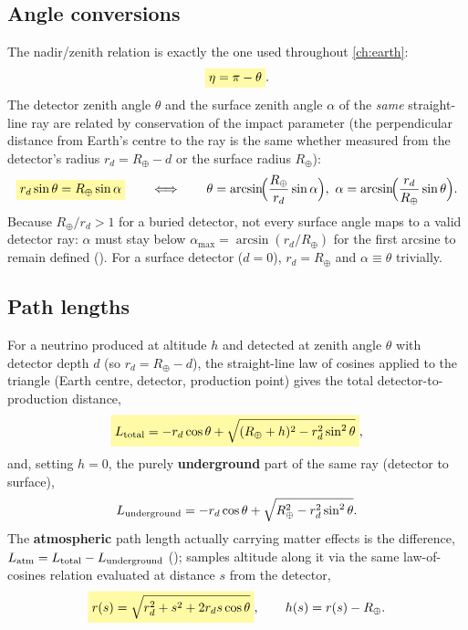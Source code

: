 \begin{theorybox}
\subsection*{Angle conversions}
The nadir/zenith relation is exactly the one used throughout
\cref{ch:earth}:
\begin{equation}
  \keyresult{\eta = \pi - \theta}.
\end{equation}
The detector zenith angle $\theta$ and the surface zenith angle $\alpha$ of
the \emph{same} straight-line ray are related by conservation of the
impact parameter (the perpendicular distance from Earth's centre to the
ray is the same whether measured from the detector's radius $r_d=R_\oplus-d$
or the surface radius $R_\oplus$):
\begin{equation}
  \keyresult{r_d\sin\theta = R_\oplus\sin\alpha}
  \qquad\Longleftrightarrow\qquad
  \theta=\arcsin\!\Bigl(\frac{R_\oplus}{r_d}\sin\alpha\Bigr),\
  \alpha=\arcsin\!\Bigl(\frac{r_d}{R_\oplus}\sin\theta\Bigr).
\end{equation}
Because $R_\oplus/r_d>1$ for a buried detector, not every surface angle
maps to a valid detector ray: $\alpha$ must stay below
$\alpha_{\max}=\arcsin(r_d/R_\oplus)$ for the first arcsine to remain
defined (\pyfunc{alpha\_max\_for\_detector\_depth}). For a surface detector
($d=0$), $r_d=R_\oplus$ and $\alpha\equiv\theta$ trivially.

\subsection*{Path lengths}
For a neutrino produced at altitude $h$ and detected at zenith angle
$\theta$ with detector depth $d$ (so $r_d=R_\oplus-d$), the straight-line
law of cosines applied to the triangle (Earth centre, detector, production
point) gives the total detector-to-production distance,
\begin{equation}
  \keyresult{L_{\rm total} = -r_d\cos\theta+\sqrt{(R_\oplus+h)^2-r_d^2\sin^2\theta}},
\end{equation}
and, setting $h=0$, the purely \textbf{underground} part of the same ray
(detector to surface),
\begin{equation}
  L_{\rm underground} = -r_d\cos\theta+\sqrt{R_\oplus^2-r_d^2\sin^2\theta}.
\end{equation}
The \textbf{atmospheric} path length actually carrying matter effects is
the difference, $L_{\rm atm}=L_{\rm total}-L_{\rm underground}$
();  samples
altitude along it via the same law-of-cosines relation evaluated at
distance $s$ from the detector,
\begin{equation}
  \keyresult{r(s)=\sqrt{r_d^2+s^2+2r_ds\cos\theta}},\qquad h(s)=r(s)-R_\oplus.
\end{equation}


\end{theorybox}
